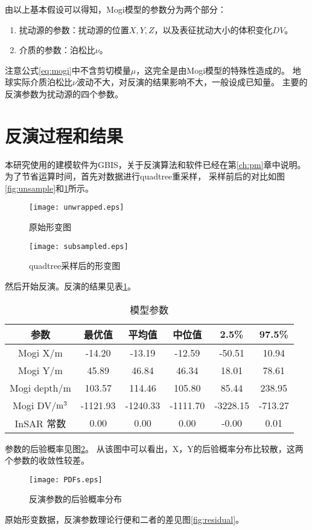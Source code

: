 由以上基本假设可以得知，Mogi模型的参数分为两个部分：
\begin{enumerate}
    \item 扰动源的参数：扰动源的位置$X,Y,Z$，以及表征扰动大小的体积变化$DV$。
    \item 介质的参数：泊松比$\nu$。
\end{enumerate}
注意公式\ref{eq:mogi}中不含剪切模量$\mu$，这完全是由Mogi模型的特殊性造成的。
地球实际介质泊松比$\nu$波动不大，对反演的结果影响不大，一般设成已知量。
主要的反演参数为扰动源的四个参数。

\section{反演过程和结果}
本研究使用的建模软件为GBIS，关于反演算法和软件已经在第\ref{ch:pm}章中说明。
为了节省运算时间，首先对数据进行quadtree重采样，
采样前后的对比如图\ref{fig:unsample}和\ref{fig:subsample}所示。
\begin{figure}[htp]
    \centering
    \begin{minipage}{0.85\textwidth}
        \centering
        \texttt{[image: unwrapped.eps]}
        \caption{原始形变图}
        \label{fig:unsample}
    \end{minipage}
    \qquad
    \begin{minipage}{0.85\textwidth}
        \centering
        \texttt{[image: subsampled.eps]}
        \caption{quadtree采样后的形变图}
        \label{fig:subsample}
    \end{minipage}
\end{figure}
然后开始反演。反演的结果见表\ref{tab:modelpar}。
\begin{table}[htb]
    \centering\small
    \caption{模型参数}
    \label{tab:modelpar}
    \begin{tabular}{@{}cccccc@{}}
    \toprule
    参数       & 最优值 & 平均值 & 中位值 & 2.5\% & 97.5\% \\ 
    \midrule
    Mogi X/m    & -14.20 & -13.19 &-12.59 & -50.51 & 10.94 \\
    Mogi Y/m     & 45.89 & 46.84 & 46.34 & 18.01 & 78.61\\
    Mogi depth/m & 103.57 & 114.46 & 105.80 & 85.44 & 238.95\\
    Mogi DV/$\rm m^3$   & -1121.93 & -1240.33 & -1111.70 & -3228.15 & -713.27\\
    InSAR 常数 & 0.00 & 0.00 & 0.00 & -0.00 & 0.01\\
    \bottomrule
    \end{tabular}
\end{table}
参数的后验概率见图\ref{fig:pdf}。
从该图中可以看出，X，Y的后验概率分布比较散，这两个参数的收敛性较差。
\begin{figure}[htb]
    \centering
    \texttt{[image: PDFs.eps]}
    \caption{反演参数的后验概率分布}
    \label{fig:pdf}
\end{figure}
原始形变数据，反演参数理论行便和二者的差见图\ref{fig:residual}。

